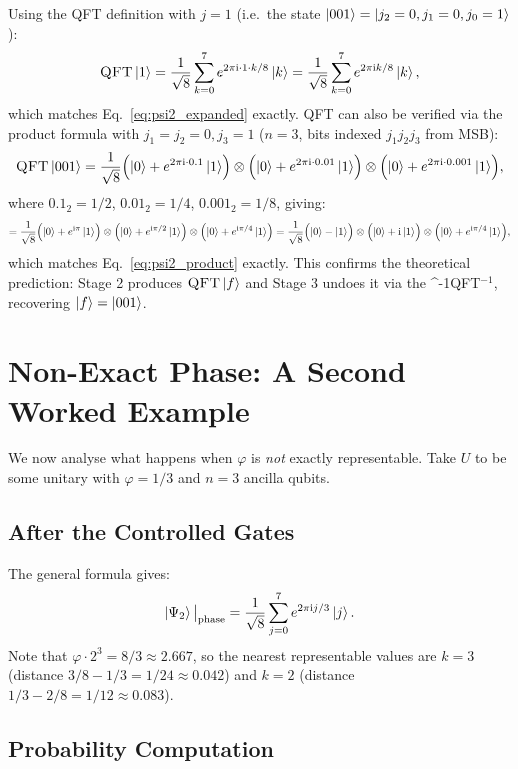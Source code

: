 \documentclass[12pt,a4paper]{article}
\newcommand{\QFT}{\textsc{QFT}}
\newcommand{\IQFT}{\ifmmode \text{\textsc{QFT}}^{-1}\else \textsc{QFT}$^{-1}$\fi}
\newcommand{\ii}{\mathrm{i}}
\begin{document}
Using the QFT definition with $j=1$ (i.e.\ the state $\Ket{001} = \Ket{j_2=0,j_1=0,j_0=1}$):
\[
  \QFT\Ket{1}
  = \frac{1}{\sqrt{8}}\sum_{k=0}^{7}e^{2\pi\ii\cdot 1\cdot k/8}\Ket{k}
  = \frac{1}{\sqrt{8}}\sum_{k=0}^{7}e^{2\pi\ii k/8}\Ket{k},
\]
which matches Eq.~\eqref{eq:psi2_expanded} exactly.
\QFT{} can also be verified via the product formula with
$j_1=j_2=0, j_3=1$ ($n=3$, bits indexed $j_1j_2j_3$ from MSB):
\[
  \QFT\Ket{001}
  = \frac{1}{\sqrt{8}}
    \Bigl(\Ket{0}+e^{2\pi\ii\cdot 0.1}\Ket{1}\Bigr)
    \otimes
    \Bigl(\Ket{0}+e^{2\pi\ii\cdot 0.01}\Ket{1}\Bigr)
    \otimes
    \Bigl(\Ket{0}+e^{2\pi\ii\cdot 0.001}\Ket{1}\Bigr),
\]
where $0.1_2 = 1/2$, $0.01_2 = 1/4$, $0.001_2 = 1/8$, giving:
\[
  = \frac{1}{\sqrt{8}}
    \Bigl(\Ket{0}+e^{\ii\pi}\Ket{1}\Bigr)
    \otimes
    \Bigl(\Ket{0}+e^{\ii\pi/2}\Ket{1}\Bigr)
    \otimes
    \Bigl(\Ket{0}+e^{\ii\pi/4}\Ket{1}\Bigr)
  = \frac{1}{\sqrt{8}}
    \Bigl(\Ket{0}-\Ket{1}\Bigr)
    \otimes
    \Bigl(\Ket{0}+\ii\Ket{1}\Bigr)
    \otimes
    \Bigl(\Ket{0}+e^{\ii\pi/4}\Ket{1}\Bigr),
\]
which matches Eq.~\eqref{eq:psi2_product} exactly.  This confirms the
theoretical prediction: Stage 2 produces $\QFT\Ket{f}$ and Stage 3 undoes
it via the \IQFT, recovering $\Ket{f} = \Ket{001}$.

\newpage

\section{Non-Exact Phase: A Second Worked Example}
\label{sec:nonexact}

We now analyse what happens when $\varphi$ is \emph{not} exactly representable.
Take $U$ to be some unitary with $\varphi = 1/3$ and $n=3$ ancilla qubits.

\subsection{After the Controlled Gates}

The general formula gives:
\[
  \Ket{\Psi_2}\big|_\text{phase}
  = \frac{1}{\sqrt{8}}\sum_{j=0}^{7}e^{2\pi\ii j/3}\Ket{j}.
\]
Note that $\varphi \cdot 2^3 = 8/3 \approx 2.667$, so the nearest representable
values are $k=3$ (distance $3/8-1/3 = 1/24 \approx 0.042$) and $k=2$
(distance $1/3 - 2/8 = 1/12 \approx 0.083$).

\subsection{Probability Computation}
\end{document}
